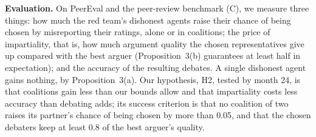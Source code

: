 \documentclass[12pt,letterpaper]{article}
\newcommand{\hd}[1]{\ifhmode\par\fi\addvspace{1pt}\noindent\textbf{#1}\hspace{0.35em}}
\begin{document}
\hd{Evaluation.} On PeerEval and the peer-review benchmark (C), we measure three things: how much the red team's dishonest agents raise their chance of being chosen by misreporting their ratings, alone or in coalitions; the price of impartiality, that is, how much argument quality the chosen representatives give up compared with the best arguer (Proposition~3(b) guarantees at least half in expectation); and the accuracy of the resulting debates. A single dishonest agent gains nothing, by Proposition~3(a). Our hypothesis, H2, tested by month 24, is that coalitions gain less than our bounds allow and that impartiality costs less accuracy than debating adds; its success criterion is that no coalition of two raises its partner's chance of being chosen by more than 0.05, and that the chosen debaters keep at least 0.8 of the best arguer's quality.
\end{document}
